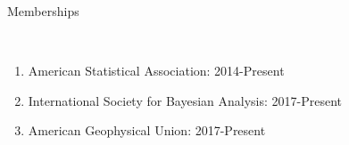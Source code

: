 \documentclass[11pt]{article}
\newcommand{\head}[1]{ %
    \bigskip %
    \begin{large}\begin{bf}{#1}\end{bf}\end{large} %

    \ \\ [-1.3cm] %

    \hrulefill}
\begin{document}
\head{Memberships}

\begin{enumerate}[label=$\bullet$]
\item American Statistical Association: 2014-Present
\item International Society for Bayesian Analysis: 2017-Present
\item American Geophysical Union: 2017-Present
\end{enumerate}



\end{document}
